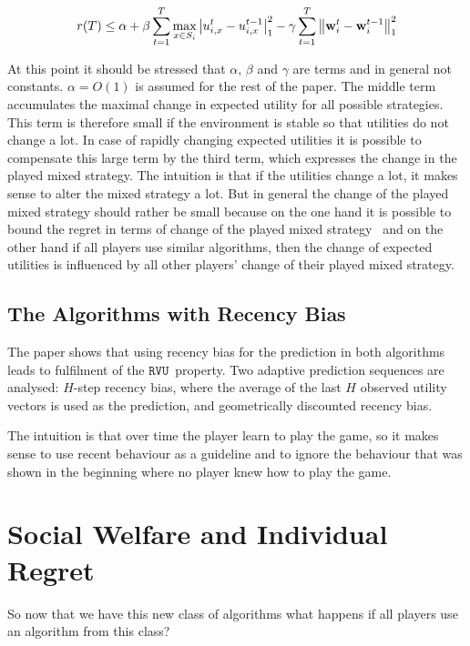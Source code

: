 \documentclass[a4paper]{article}
\theoremstyle{definition}
\newcommand{\myprop}{\ensuremath{\texttt{RVU}}}
\renewcommand{\vec}[1]{\ensuremath{{\bf #1}}}
\begin{document}
 \begin{equation*}
   r(T) \leq \alpha
   +\beta \sum_{t=1}^{T} \max_{x \in S_i} \left| u_{i,x}^t - u_{i,x}^{t-1} \right|_1^2 -
   \gamma\sum_{t=1}^{T} \left\|\vec{w}_i^{t} - \vec{w}_i^{t-1}\right\|^2_1
 \end{equation*}  

At this point it should be stressed that $\alpha$, $\beta$ and $\gamma$
are terms and in general not constants.
$\alpha = O(1)$ is assumed for the rest of the paper.
The middle term accumulates the maximal change in expected utility for
all possible strategies.
This term is therefore small if the environment is stable so that
utilities do not change a lot.
In case of rapidly changing expected utilities it is possible to
compensate this large term by the third term, which expresses the change in the
played mixed strategy.
The intuition is that if the utilities change a lot, it makes sense to
alter  the mixed strategy a lot.
But in general the change of the played mixed strategy should rather
be small because on the one hand it is possible to bound the regret in
terms of change of the played mixed strategy~\cite[p.151, Lemma
7]{Stanford}
and on the other hand if all players use similar algorithms, then the
change of expected utilities is influenced by all other players'
change of their played mixed strategy.


\subsection{The Algorithms with Recency Bias}
\label{sec:algor-with-recency}

The paper shows that using recency bias for the prediction in both
algorithms leads to fulfilment of the \myprop~property.
Two adaptive prediction sequences are analysed:
$H$-step recency bias, where the average of the last $H$ observed
utility vectors is used as the prediction, and geometrically
discounted recency bias.

The intuition is that over time the player learn to play the game, so
it makes sense to use recent behaviour as a guideline and to ignore the
behaviour that was shown in the beginning where no player knew how to
play the game.

\section{Social Welfare and Individual Regret}
So now that we have this new class of algorithms what happens if all
players use an algorithm from this class?
\end{document}
